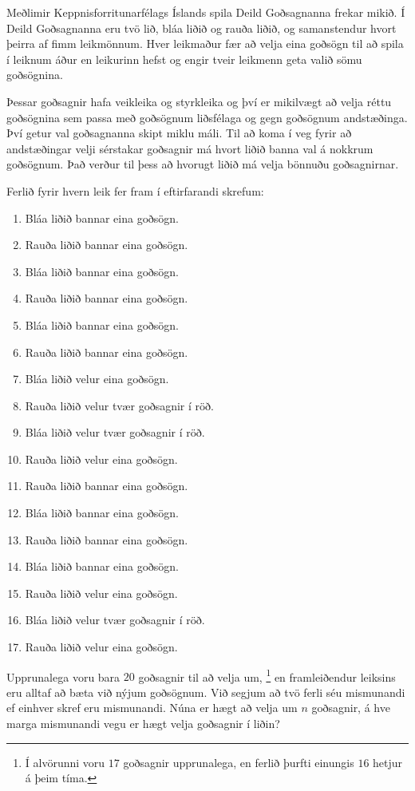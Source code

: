 
Meðlimir Keppnisforritunarfélags Íslands spila Deild Goðsagnanna frekar mikið.
Í Deild Goðsagnanna eru tvö lið, bláa liðið og rauða liðið, og samanstendur hvort þeirra af fimm leikmönnum.
Hver leikmaður fær að velja eina goðsögn til að spila í leiknum áður en leikurinn hefst og engir tveir leikmenn geta valið sömu goðsögnina.

Þessar goðsagnir hafa veikleika og styrkleika og því er mikilvægt að velja réttu goðsögnina sem passa með goðsögnum liðsfélaga og gegn goðsögnum andstæðinga.
Því getur val goðsagnanna skipt miklu máli.
Til að koma í veg fyrir að andstæðingar velji sérstakar goðsagnir má hvort liðið banna val á nokkrum goðsögnum.
Það verður til þess að hvorugt liðið má velja bönnuðu goðsagnirnar.

Ferlið fyrir hvern leik fer fram í eftirfarandi skrefum:
\begin{enumerate}
    \item Bláa liðið bannar eina goðsögn.
    \item Rauða liðið bannar eina goðsögn.
    \item Bláa liðið bannar eina goðsögn.
    \item Rauða liðið bannar eina goðsögn.
    \item Bláa liðið bannar eina goðsögn.
    \item Rauða liðið bannar eina goðsögn.
    \item Bláa liðið velur eina goðsögn.
    \item Rauða liðið velur tvær goðsagnir í röð.
    \item Bláa liðið velur tvær goðsagnir í röð.
    \item Rauða liðið velur eina goðsögn.
    \item Rauða liðið bannar eina goðsögn.
    \item Bláa liðið bannar eina goðsögn.
    \item Rauða liðið bannar eina goðsögn.
    \item Bláa liðið bannar eina goðsögn.
    \item Rauða liðið velur eina goðsögn.
    \item Bláa liðið velur tvær goðsagnir í röð.
    \item Rauða liðið velur eina goðsögn.
\end{enumerate}

Upprunalega voru bara $20$ goðsagnir til að velja um,
\footnote{Í alvörunni voru $17$ goðsagnir upprunalega, en ferlið þurfti einungis $16$ hetjur á þeim tíma.}
en framleiðendur leiksins eru alltaf að bæta við nýjum goðsögnum.
Við segjum að tvö ferli séu mismunandi ef einhver skref eru mismunandi.
Núna er hægt að velja um $n$ goðsagnir, á hve marga mismunandi vegu er hægt velja goðsagnir í liðin?

